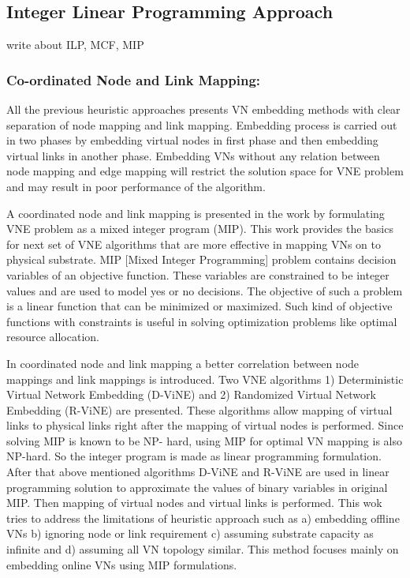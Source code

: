 \documentclass[article,dr=phil,type=msc ,colorback,accentcolor=tud4b]{tudthesis}
\begin{document}
\subsection{Integer Linear Programming Approach} 
write about ILP, MCF, MIP

\subsubsection{Co-ordinated Node and Link Mapping:}

All the previous heuristic approaches presents VN embedding methods with clear separation of node mapping and link mapping. Embedding process is carried out in two phases by embedding virtual nodes in first phase and then embedding virtual links in another phase. Embedding VNs without any relation between node mapping and edge mapping will restrict the solution space for VNE problem and may result in poor performance of the algorithm.  \newline

A coordinated node and link mapping is presented in the work \cite{coord_map} by formulating VNE problem as a mixed integer program (MIP). This work provides the basics for next set of VNE algorithms that are more effective in mapping VNs on to physical substrate. MIP [Mixed Integer Programming] problem contains decision variables of an objective function. These variables are constrained to be integer values and are used to model yes or no decisions. The objective of such a problem is a linear function that can be minimized or maximized. Such kind of objective functions with constraints is useful in solving optimization problems like optimal resource allocation. \newline

In coordinated node and link mapping \cite{coord_map} a better correlation between node mappings and link mappings is introduced. Two VNE algorithms 1) Deterministic Virtual Network Embedding (D-ViNE) and 2) Randomized Virtual Network Embedding (R-ViNE) are presented. These algorithms allow mapping of virtual links to physical links right after the mapping of virtual nodes is performed. Since solving MIP is known to be NP- hard, using MIP for optimal VN mapping is also NP-hard. So the integer program is made as linear programming formulation.  After that above mentioned algorithms D-ViNE and R-ViNE are used in linear programming solution to approximate the values of binary variables in original MIP. Then mapping of virtual nodes and virtual links is performed. This wok tries to address the limitations of heuristic approach such as a) embedding offline VNs b) ignoring node or link requirement c) assuming substrate capacity as infinite and d) assuming all VN topology similar.  This method focuses mainly on embedding online VNs using MIP formulations.\newline
\end{document}

